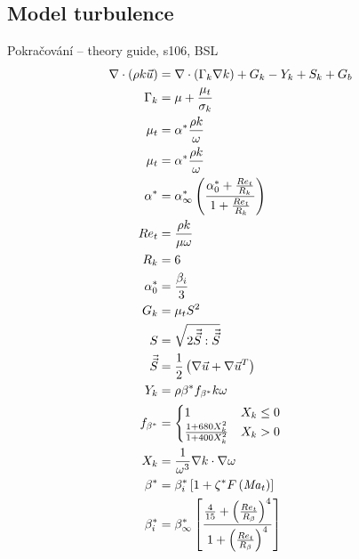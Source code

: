     \subsection{Model turbulence}
        Pokračování – theory guide, s106, BSL
        \begin{align} \label{eq:rovnice-pro-k} 
            \nabla \cdot \left( \rho k \Vec{u} \right) &= \nabla \cdot \left( \Gamma _k \nabla k \right) + G _k - Y _k + S _k + G _b \\
            \Gamma _k &= \mu + \frac{\mu _t}{\sigma _k} \\
            \mu _t &= \alpha ^* \frac{\rho k}{\omega} \\
            \mu _t &= \alpha ^* \frac{\rho k}{\omega} \\
            \alpha ^* &= \alpha ^* _\infty \left( \frac{\alpha _0 ^* + \frac{Re_t}{R_k}}{1 + \frac{Re_t}{R_k}} \right) \\
            Re_t &= \frac{\rho k}{\mu \omega} \\
            R_k &= 6 \\
            \alpha ^* _0 &= \frac{\beta _i}{3} \\
            G_k &= \mu _t S^2 \\
            S &= \sqrt{2 \Vec{\Vec{S}} : \Vec{\Vec{S}}} \\
            \Vec{\Vec{S}} &= \frac{1}{2} \left( \nabla \Vec{u} + \nabla \Vec{u} ^T \right) \\
            Y _k &= \rho \beta ^* f_{\beta ^*} k \omega \\
            f_{\beta ^*} &= \begin{cases} 
                1 & X_k \leq 0 \\
                \frac{1 + 680 X _k ^2}{1 + 400 X _k ^2} & X _k > 0 \\                
                \end{cases} \\
            X _k &= \frac{1}{\omega ^3} \nabla k \cdot \nabla \omega \\
            \beta ^* &= \beta ^* _i \left[ 1 + \zeta ^* F \left( \mathord{\mathit{Ma}}_t \right) \right] \\
            \beta _i ^* &= \beta _\infty ^* \left[ \frac{\frac{4}{15} + \left( \frac{Re_t}{R_\beta} \right)^4}{1 + \left( \frac{Re_t}{R_\beta} \right)^4} \right]
        \end{align}

